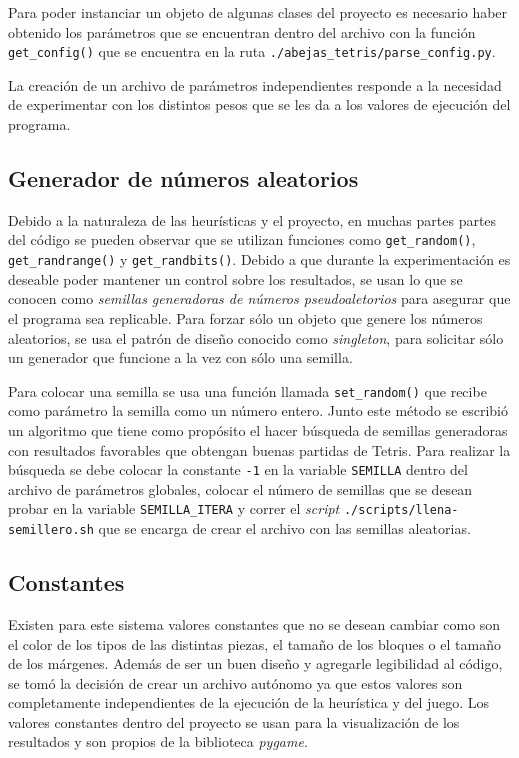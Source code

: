 Para poder instanciar un objeto de algunas clases del proyecto 
es necesario haber obtenido los parámetros que se encuentran dentro 
del archivo con la función \texttt{get\_config()} que se encuentra en la ruta  
\texttt{./abejas\_tetris/parse\_config.py}. 

La creación de un archivo de parámetros independientes responde a la necesidad 
de experimentar con los distintos pesos que se les da a los valores de 
ejecución del programa.


\subsection{Generador de números aleatorios}

Debido a la naturaleza de las heurísticas y el proyecto, en muchas partes partes 
del código se pueden observar que se utilizan funciones como \texttt{get\_random()}, 
\texttt{get\_randrange()} y \texttt{get\_randbits()}. Debido a que durante la experimentación 
es deseable poder mantener un control sobre los resultados, se usan lo 
que se conocen como \textit{semillas generadoras de números pseudoaletorios} para 
asegurar que el programa sea replicable. 
Para forzar sólo un objeto que genere 
los números aleatorios, se usa el patrón de diseño conocido como
\textit{singleton}, para solicitar sólo un generador que funcione a la vez con sólo 
una semilla.

Para colocar una semilla se usa una función llamada \texttt{set\_random()} que 
recibe como parámetro la semilla como un número entero. 
Junto este método se escribió un algoritmo que tiene como propósito el 
hacer búsqueda de semillas generadoras con resultados favorables 
que obtengan buenas partidas de Tetris. Para realizar la búsqueda se debe colocar 
la constante \texttt{-1} en la variable \texttt{SEMILLA} dentro del archivo 
de parámetros globales, colocar el número de semillas que se desean probar 
en la variable \texttt{SEMILLA\_ITERA} y correr el \textit{script} 
\texttt{./scripts/llena-semillero.sh} que se encarga de crear el archivo con las 
semillas aleatorias.

\subsection{Constantes}

Existen para este sistema valores constantes que no se desean cambiar como 
son el color de los tipos de las distintas piezas, el tamaño de los bloques o 
el tamaño de los márgenes. Además de ser un buen diseño y agregarle legibilidad al 
código, se tomó la decisión de crear un archivo autónomo ya que estos valores son 
completamente independientes de la ejecución de la heurística y del juego. Los 
valores constantes dentro del proyecto se usan para la visualización de los 
resultados y son propios de la biblioteca \textit{pygame}.

